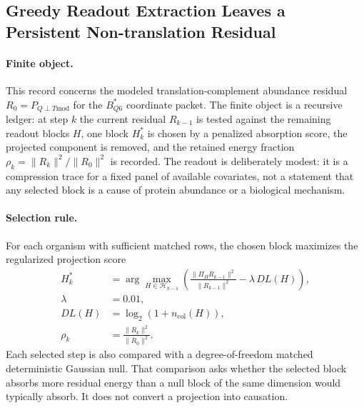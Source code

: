 \subsection{Greedy Readout Extraction Leaves a Persistent Non-translation Residual}
\label{sec:q6-residual-basis-extraction-greedy-readout-cross-layer}

\paragraph{Finite object.}
This record concerns the modeled translation-complement abundance residual $R_0=P_{Q\perp T\mathrm{mod}}$ for the $B^*_{Q6}$ coordinate packet.  The finite object is a recursive ledger: at step $k$ the current residual $R_{k-1}$ is tested against the remaining readout blocks $H$, one block $H_k^*$ is chosen by a penalized absorption score, the projected component is removed, and the retained energy fraction $\rho_k=\|R_k\|^2/\|R_0\|^2$ is recorded.  The readout is deliberately modest: it is a compression trace for a fixed panel of available covariates, not a statement that any selected block is a cause of protein abundance or a biological mechanism.

\paragraph{Selection rule.}
For each organism with sufficient matched rows, the chosen block maximizes the regularized projection score
$$
\begin{aligned}
H_k^* &= \arg\max_{H\in\mathcal H_{k-1}}\left(\frac{\|\Pi_H R_{k-1}\|^2}{\|R_{k-1}\|^2}-\lambda\,DL(H)\right),\\
\lambda &= 0.01,\\
DL(H) &= \log_2(1+n_{\mathrm{col}}(H)),\\
\rho_k &= \frac{\|R_k\|^2}{\|R_0\|^2}.
\end{aligned}
$$
Each selected step is also compared with a degree-of-freedom matched deterministic Gaussian null.  That comparison asks whether the selected block absorbs more residual energy than a null block of the same dimension would typically absorb.  It does not convert a projection into causation.

